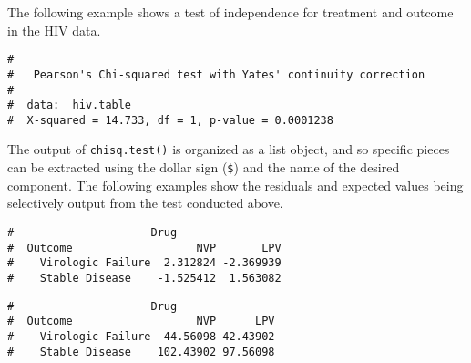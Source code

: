 \documentclass[letterpaper,12pt,twoside,]{pinp}
\begin{document}
The following example shows a test of independence for treatment and
outcome in the HIV data.

\begin{Shaded}
\begin{Highlighting}[]
\end{Highlighting}
\end{Shaded}

\begin{ShadedResult}
\begin{verbatim}
#  
#   Pearson's Chi-squared test with Yates' continuity correction
#  
#  data:  hiv.table
#  X-squared = 14.733, df = 1, p-value = 0.0001238
\end{verbatim}
\end{ShadedResult}

The output of \texttt{chisq.test()} is organized as a list object, and
so specific pieces can be extracted using the dollar sign (\texttt{\$})
and the name of the desired component. The following examples show the
residuals and expected values being selectively output from the test
conducted above.

\begin{Shaded}
\begin{Highlighting}[]
\OperatorTok{$}
\end{Highlighting}
\end{Shaded}

\begin{ShadedResult}
\begin{verbatim}
#                     Drug
#  Outcome                   NVP       LPV
#    Virologic Failure  2.312824 -2.369939
#    Stable Disease    -1.525412  1.563082
\end{verbatim}
\end{ShadedResult}

\begin{Shaded}
\begin{Highlighting}[]
\OperatorTok{$}
\end{Highlighting}
\end{Shaded}

\begin{ShadedResult}
\begin{verbatim}
#                     Drug
#  Outcome                   NVP      LPV
#    Virologic Failure  44.56098 42.43902
#    Stable Disease    102.43902 97.56098
\end{verbatim}
\end{ShadedResult}
\end{document}
